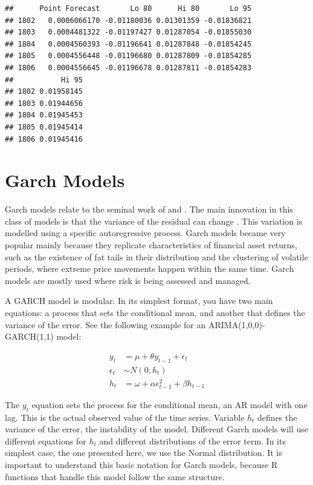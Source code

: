 \documentclass[11pt,]{book}
\begin{document}
\begin{verbatim}
##      Point Forecast       Lo 80      Hi 80       Lo 95
## 1802   0.0006066170 -0.01180036 0.01301359 -0.01836821
## 1803   0.0004481322 -0.01197427 0.01287054 -0.01855030
## 1804   0.0004560393 -0.01196641 0.01287848 -0.01854245
## 1805   0.0004556448 -0.01196680 0.01287809 -0.01854285
## 1806   0.0004556645 -0.01196678 0.01287811 -0.01854283
##           Hi 95
## 1802 0.01958145
## 1803 0.01944656
## 1804 0.01945453
## 1805 0.01945414
## 1806 0.01945416
\end{verbatim}

\section{Garch Models}\label{garch-models}

Garch models relate to the seminal work of
\citet{engle1982autoregressive} and \citet{bollerslev1986generalized}.
The main innovation in this class of models is that the variance of the
residual can change . This variation is modelled using a specific
autoregressive process. Garch models became very popular mainly because
they replicate characteristics of financial asset returns, such as the
existence of fat tails in their distribution and the clustering of
volatile periods, where extreme price movements happen within the same
time. Garch models are mostly used where risk is being assessed and
managed. 

A GARCH model is modular. In its simplest format, you have two main
equations: a process that sets the conditional mean, and another that
defines the variance of the error. See the following example for an
ARIMA(1,0,0)-GARCH(1,1) model:

\[\begin{aligned} y _t &=  \mu + \theta y_{t-1} + \epsilon _t \\\epsilon _t &\sim N \left(0, h _t \right ) \\h _t &= \omega + \alpha \epsilon ^2 _{t-1}+ \beta h_{t-1} \end{aligned} \]

The \(y_t\) equation sets the process for the conditional mean, an AR
model with one lag. This is the actual observed value of the time
series. Variable \(h_t\) defines the variance of the error, the
instability of the model. Different Garch models will use different
equations for \(h_t\) and different distributions of the error term. In
its simplest case, the one presented here, we use the Normal
distribution. It is important to understand this basic notation for
Garch models, because R functions that handle this model follow the same
structure.
\end{document}
